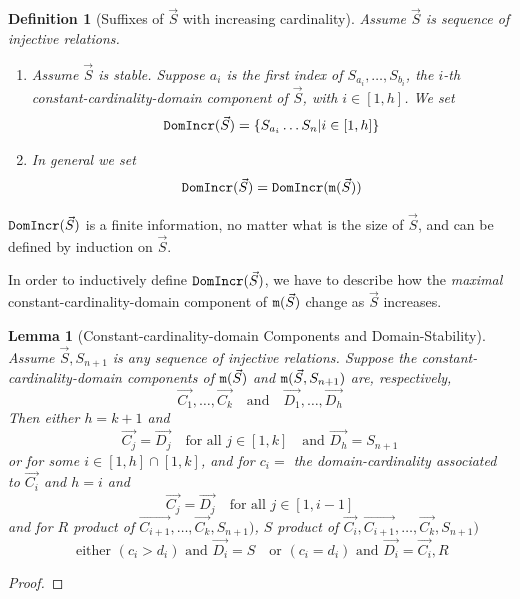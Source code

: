 \documentclass{lmcs}
\newtheorem{lemma}[theorem]{Lemma}
\newtheorem{definition}[theorem]{Definition}
\begin{document}
\begin{definition}[Suffixes of $\vec{S}$ with increasing cardinality] 
Assume $\vec{S}$ is sequence of injective relations. 
\begin{enumerate}

\item
Assume $\vec{S}$ is stable. Suppose $a_i$ is the first index of 
$S_{a_{i}}, \ldots, S_{b_{i}}$,
the $i$-th constant-cardinality-domain component of $\vec{S}$, with $i \in [1,h]$.
We set
$$
{\tt DomIncr}(\vec{S}) = \{S_{a_i} \ldots S_n | i \in [1,h] \}
$$

\item
In general we set 
$$
{\tt DomIncr}(\vec{S}) = {\tt DomIncr}({\tt m}(\vec{S}))
$$
\end{enumerate}
\end{definition}



${\tt DomIncr}(\vec{S}) $ is a finite information, no matter what is the size of $\vec{S}$,
and can be defined by induction on $\vec{S}$.


In order to inductively define ${\tt DomIncr}(\vec{S}) $, we have to describe how the 
\emph{maximal} constant-cardinality-domain component of ${\tt m}(\vec{S})$ 
change as $\vec{S}$ increases.



\begin{lemma}[Constant-cardinality-domain Components and Domain-Stability]
\label{lemma-cardinality-stability}
Assume $\vec{S}, S_{n+1}$ is any sequence of injective relations. Suppose 
the constant-cardinality-domain components of ${\tt m}(\vec{S})$ and 
${\tt m}(\vec{S}, S_{n+1})$ are, respectively, 
$$
\vec{C_1}, \ldots,\vec{C_k} \ \ \ \mbox{ and } \ \ \   \vec{D_1}, \ldots,\vec{D_h}
$$
Then either $h=k+1$ and
$$
\vec{C_j} = \vec{D_j} \ \ \ \mbox{ for all $j \in [1,k]$ }   \mbox{ and } \vec{D_h} = S_{n+1}
$$
or for some $i \in [1,h] \cap [1,k]$, and for $c_i = $ the domain-cardinality associated to 
$\vec{C_i}$ and $h=i$ and
$$
\vec{C_j} = \vec{D_j} \ \ \ \mbox{ for all $j \in [1,i-1]$}
$$
and for $R$ product of $\vec{C_{i+1}}, \ldots,\vec{C_k}, S_{n+1})$,
$S$ product of $\vec{C_{i}}, \vec{C_{i+1}}, \ldots,\vec{C_k}, S_{n+1})$
$$
\mbox{ either } (c_i > d_i)   
\mbox{ and } \vec{D_i} = S  \ \ \ 
\mbox{ or }    (c_i = d_i)
\mbox{ and } \vec{D_i} = \vec{C_i}, R
$$
\end{lemma}

\begin{proof}

\end{proof}
\end{document}
